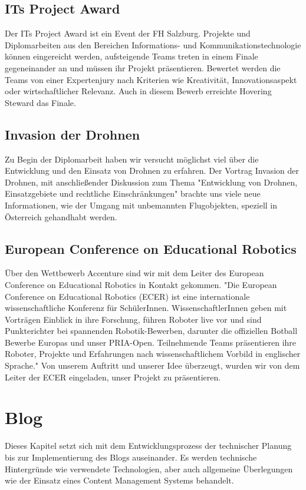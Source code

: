     \subsection*{ITs Project Award}
    Der {ITs Project Award\cite{its}} ist ein Event der FH Salzburg. Projekte und Diplomarbeiten aus den Bereichen Informations- und Kommunikationstechnologie
    können eingereicht werden, aufsteigende Teams treten in einem Finale gegeneinander an und müssen ihr Projekt präsentieren. Bewertet werden die
    Teams von einer Expertenjury nach Kriterien wie Kreativität, Innovationsaspekt oder wirtschaftlicher Relevanz.
    Auch in diesem Bewerb erreichte Hovering Steward das Finale.

    \subsection*{Invasion der Drohnen}
    Zu Begin der Diplomarbeit haben wir versucht möglichst viel über die Entwicklung und den Einsatz von Drohnen zu erfahren.
    Der Vortrag {Invasion der Drohnen\cite{invasionderdrohnen}}, mit anschließender Diskussion zum Thema "Entwicklung von Drohnen, Einsatzgebiete und rechtliche Einschränkungen" brachte
    uns viele neue Informationen, wie der Umgang mit unbemannten Flugobjekten, speziell in Österreich gehandhabt werden.

    \subsection*{European Conference on Educational Robotics}
    Über den Wettbewerb Accenture sind wir mit dem Leiter des {European Conference on Educational Robotics\cite{ecer}} in Kontakt gekommen.
    "Die European Conference on Educational Robotics (ECER) ist eine internationale wissenschaftliche Konferenz für SchülerInnen. WissenschaftlerInnen
    geben mit Vorträgen Einblick in ihre Forschung, führen Roboter live vor und sind Punkterichter bei spannenden Robotik-Bewerben, darunter die
    offiziellen Botball Bewerbe Europas und unser PRIA-Open. Teilnehmende Teams präsentieren ihre Roboter, Projekte und Erfahrungen nach wissenschaftlichem
    Vorbild in englischer Sprache."
    Von unserem Auftritt und unserer Idee überzeugt, wurden wir von dem Leiter der ECER eingeladen, unser Projekt zu präsentieren.


\section{Blog}
Dieses Kapitel setzt sich mit dem Entwicklungsprozess der technischer Planung bis zur Implementierung
des Blogs auseinander. Es werden technische Hintergründe wie verwendete Technologien, aber
auch allgemeine Überlegungen wie der Einsatz eines Content Management Systems behandelt.

